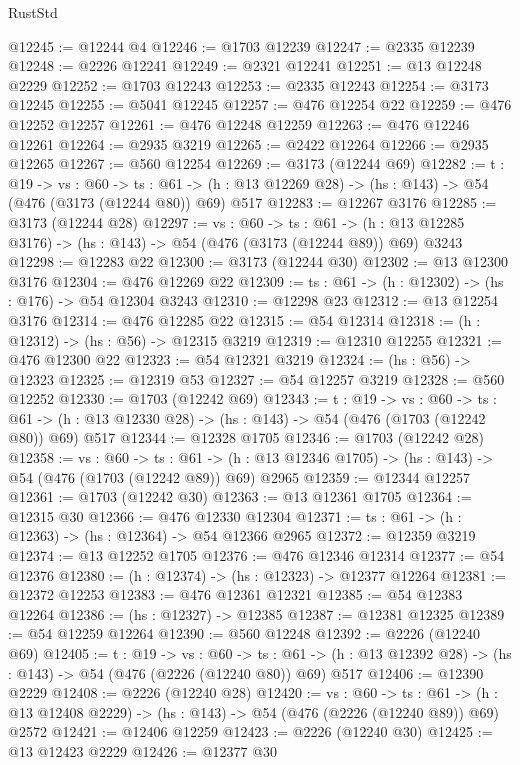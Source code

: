 \begin{lexlean}{RustStd}
\begin{coremodule}
@12245 := @12244 @4
@12246 := @1703 @12239
@12247 := @2335 @12239
@12248 := @2226 @12241
@12249 := @2321 @12241
@12251 := @13 @12248 @2229
@12252 := @1703 @12243
@12253 := @2335 @12243
@12254 := @3173 @12245
@12255 := @5041 @12245
@12257 := @476 @12254 @22
@12259 := @476 @12252 @12257
@12261 := @476 @12248 @12259
@12263 := @476 @12246 @12261
@12264 := @2935 @3219
@12265 := @2422 @12264
@12266 := @2935 @12265
@12267 := @560 @12254
@12269 := @3173 (@12244 @69)
@12282 := {t : @19} ->
  {vs : @60} ->
  {ts : @61} -> (h : @13 @12269 @28) -> (hs : @143) -> @54 (@476 (@3173 (@12244 @80)) @69) @517
@12283 := @12267 @3176
@12285 := @3173 (@12244 @28)
@12297 := {vs : @60} ->
  {ts : @61} -> (h : @13 @12285 @3176) -> (hs : @143) -> @54 (@476 (@3173 (@12244 @89)) @69) @3243
@12298 := @12283 @22
@12300 := @3173 (@12244 @30)
@12302 := @13 @12300 @3176
@12304 := @476 @12269 @22
@12309 := {ts : @61} -> (h : @12302) -> (hs : @176) -> @54 @12304 @3243
@12310 := @12298 @23
@12312 := @13 @12254 @3176
@12314 := @476 @12285 @22
@12315 := @54 @12314
@12318 := (h : @12312) -> (hs : @56) -> @12315 @3219
@12319 := @12310 @12255
@12321 := @476 @12300 @22
@12323 := @54 @12321 @3219
@12324 := (hs : @56) -> @12323
@12325 := @12319 @53
@12327 := @54 @12257 @3219
@12328 := @560 @12252
@12330 := @1703 (@12242 @69)
@12343 := {t : @19} ->
  {vs : @60} ->
  {ts : @61} -> (h : @13 @12330 @28) -> (hs : @143) -> @54 (@476 (@1703 (@12242 @80)) @69) @517
@12344 := @12328 @1705
@12346 := @1703 (@12242 @28)
@12358 := {vs : @60} ->
  {ts : @61} -> (h : @13 @12346 @1705) -> (hs : @143) -> @54 (@476 (@1703 (@12242 @89)) @69) @2965
@12359 := @12344 @12257
@12361 := @1703 (@12242 @30)
@12363 := @13 @12361 @1705
@12364 := @12315 @30
@12366 := @476 @12330 @12304
@12371 := {ts : @61} -> (h : @12363) -> (hs : @12364) -> @54 @12366 @2965
@12372 := @12359 @3219
@12374 := @13 @12252 @1705
@12376 := @476 @12346 @12314
@12377 := @54 @12376
@12380 := (h : @12374) -> (hs : @12323) -> @12377 @12264
@12381 := @12372 @12253
@12383 := @476 @12361 @12321
@12385 := @54 @12383 @12264
@12386 := (hs : @12327) -> @12385
@12387 := @12381 @12325
@12389 := @54 @12259 @12264
@12390 := @560 @12248
@12392 := @2226 (@12240 @69)
@12405 := {t : @19} ->
  {vs : @60} ->
  {ts : @61} -> (h : @13 @12392 @28) -> (hs : @143) -> @54 (@476 (@2226 (@12240 @80)) @69) @517
@12406 := @12390 @2229
@12408 := @2226 (@12240 @28)
@12420 := {vs : @60} ->
  {ts : @61} -> (h : @13 @12408 @2229) -> (hs : @143) -> @54 (@476 (@2226 (@12240 @89)) @69) @2572
@12421 := @12406 @12259
@12423 := @2226 (@12240 @30)
@12425 := @13 @12423 @2229
@12426 := @12377 @30

\end{coremodule}
\end{lexlean}
